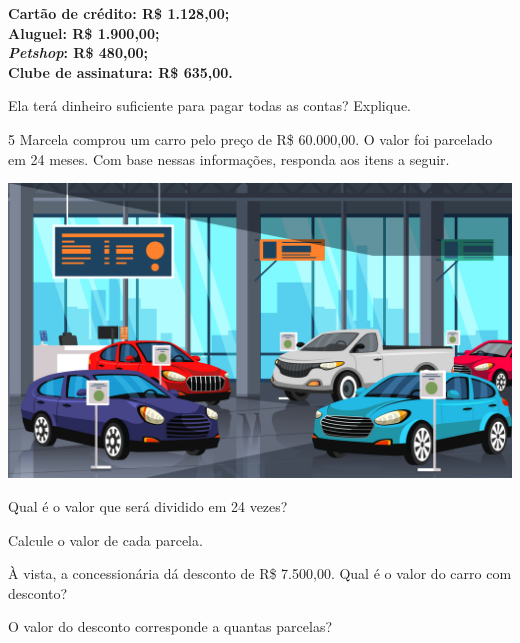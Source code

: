\begin{myquote}
\textbf{Cartão de crédito: R\$ 1.128,00;\\
  Aluguel: R\$ 1.900,00;\\
  \textit{Petshop}: R\$ 480,00;\\
  Clube de assinatura: R\$ 635,00.}
\end{myquote}

Ela terá dinheiro suficiente para pagar todas as contas? Explique.


\num{5} Marcela comprou um carro pelo preço de R\$ 60.000,00.
O valor foi parcelado em 24 meses. Com base nessas informações,
responda aos itens a seguir.

\begin{center}
\includegraphics[width=.5\textwidth]{media/image37b.jpeg}
\end{center}\enlargethispage{3\baselineskip}

\begin{escolha}
\item Qual é o valor que será dividido em 24 vezes?\\

\item Calcule o valor de cada parcela.\\

\item À vista, a concessionária dá desconto de R\$ 7.500,00.
  Qual é o valor do carro com desconto? \\

\item O valor do desconto corresponde a quantas parcelas?\\
\end{escolha}

